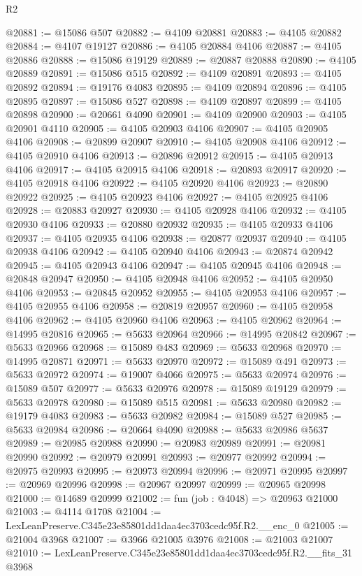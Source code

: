 \begin{lexlean}{R2}
\begin{coremodule}
@20881 := @15086 @507
@20882 := @4109 @20881
@20883 := @4105 @20882
@20884 := @4107 @19127
@20886 := @4105 @20884 @4106
@20887 := @4105 @20886
@20888 := @15086 @19129
@20889 := @20887 @20888
@20890 := @4105 @20889
@20891 := @15086 @515
@20892 := @4109 @20891
@20893 := @4105 @20892
@20894 := @19176 @4083
@20895 := @4109 @20894
@20896 := @4105 @20895
@20897 := @15086 @527
@20898 := @4109 @20897
@20899 := @4105 @20898
@20900 := @20661 @4090
@20901 := @4109 @20900
@20903 := @4105 @20901 @4110
@20905 := @4105 @20903 @4106
@20907 := @4105 @20905 @4106
@20908 := @20899 @20907
@20910 := @4105 @20908 @4106
@20912 := @4105 @20910 @4106
@20913 := @20896 @20912
@20915 := @4105 @20913 @4106
@20917 := @4105 @20915 @4106
@20918 := @20893 @20917
@20920 := @4105 @20918 @4106
@20922 := @4105 @20920 @4106
@20923 := @20890 @20922
@20925 := @4105 @20923 @4106
@20927 := @4105 @20925 @4106
@20928 := @20883 @20927
@20930 := @4105 @20928 @4106
@20932 := @4105 @20930 @4106
@20933 := @20880 @20932
@20935 := @4105 @20933 @4106
@20937 := @4105 @20935 @4106
@20938 := @20877 @20937
@20940 := @4105 @20938 @4106
@20942 := @4105 @20940 @4106
@20943 := @20874 @20942
@20945 := @4105 @20943 @4106
@20947 := @4105 @20945 @4106
@20948 := @20848 @20947
@20950 := @4105 @20948 @4106
@20952 := @4105 @20950 @4106
@20953 := @20845 @20952
@20955 := @4105 @20953 @4106
@20957 := @4105 @20955 @4106
@20958 := @20819 @20957
@20960 := @4105 @20958 @4106
@20962 := @4105 @20960 @4106
@20963 := @4105 @20962
@20964 := @14995 @20816
@20965 := @5633 @20964
@20966 := @14995 @20842
@20967 := @5633 @20966
@20968 := @15089 @483
@20969 := @5633 @20968
@20970 := @14995 @20871
@20971 := @5633 @20970
@20972 := @15089 @491
@20973 := @5633 @20972
@20974 := @19007 @4066
@20975 := @5633 @20974
@20976 := @15089 @507
@20977 := @5633 @20976
@20978 := @15089 @19129
@20979 := @5633 @20978
@20980 := @15089 @515
@20981 := @5633 @20980
@20982 := @19179 @4083
@20983 := @5633 @20982
@20984 := @15089 @527
@20985 := @5633 @20984
@20986 := @20664 @4090
@20988 := @5633 @20986 @5637
@20989 := @20985 @20988
@20990 := @20983 @20989
@20991 := @20981 @20990
@20992 := @20979 @20991
@20993 := @20977 @20992
@20994 := @20975 @20993
@20995 := @20973 @20994
@20996 := @20971 @20995
@20997 := @20969 @20996
@20998 := @20967 @20997
@20999 := @20965 @20998
@21000 := @14689 @20999
@21002 := fun (job : @4048) => @20963 @21000
@21003 := @4114 @1708
@21004 := LexLeanPreserve.C345e23e85801dd1daa4ec3703cedc95f.R2.__enc_0
@21005 := @21004 @3968
@21007 := @3966 @21005 @3976
@21008 := @21003 @21007
@21010 := LexLeanPreserve.C345e23e85801dd1daa4ec3703cedc95f.R2.__fits_31 @3968

\end{coremodule}
\end{lexlean}
